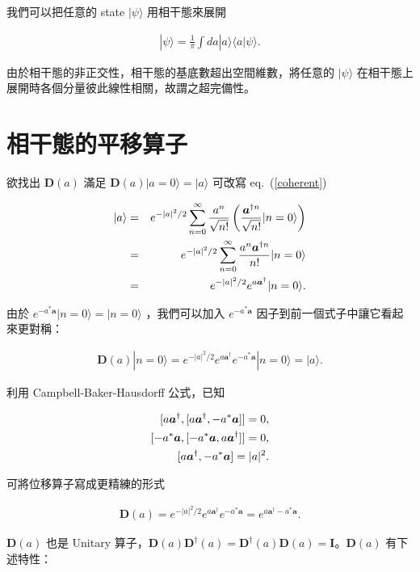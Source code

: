 \documentclass[pop,reprint]{revtex4-1}
\newcommand{\ket}[1]{|#1\rangle }
\newcommand{\braket}[2]{\langle#1|#2\rangle }
\begin{document}
我們可以把任意的 state $ \ket{\psi} $ 用相干態來展開

\begin{eqnarray}
\ket{\psi}=\frac{1}{\pi}\int da\ket{a}\braket{a}{\psi}.
\end{eqnarray}

由於相干態的非正交性，相干態的基底數超出空間維數，將任意的 $ \ket{\psi} $ 在相干態上展開時各個分量彼此線性相關，故謂之超完備性。

\section{相干態的平移算子}

欲找出 $ \bm{D}(a) $ 滿足 $  \bm{D}(a)\ket{a=0}=\ket{a} $ 可改寫 eq.~(\ref{coherent})

\begin{eqnarray}
\notag\ket{a}&=&e^{-|a|^2/2}\sum_{n=0}^\infty\frac{a^n}{\sqrt{n!}}\left(\frac{\bm{a}^{\dag n}}{\sqrt{n!}}\ket{n=0}\right)\\
\notag&=&e^{-|a|^2/2}\sum_{n=0}^\infty\frac{a^n\bm{a}^{\dag n}}{n!}\ket{n=0}\\
&=&e^{-|a|^2/2}e^{a\bm{a}^\dag}\ket{n=0}.
\end{eqnarray}

由於 $ e^{-a^*\bm{a}}\ket{n=0}=\ket{n=0} $ ，我們可以加入 $e^{-a^*\bm{a}}$ 因子到前一個式子中讓它看起來更對稱：

\begin{eqnarray}
\bm{D}(a)\ket{n=0}=e^{-|a|^2/2}e^{a\bm{a}^\dag}e^{-a^*\bm{a}}\ket{n=0}=\ket{a}.
\end{eqnarray}

利用 Campbell-Baker-Hausdorff 公式，已知

\begin{eqnarray}
\notag [a\bm{a}^\dag,[a\bm{a}^\dag,-a^*\bm{a}]]=0,\\
\notag [-a^*\bm{a},[-a^*\bm{a},a\bm{a}^\dag]]=0,\\
\protect[a\bm{a}^\dag, -a^*\bm{a}]=|a|^2.
\end{eqnarray}

可將位移算子寫成更精練的形式

\begin{eqnarray}
\bm{D}(a)=e^{-|a|^2/2}e^{a\bm{a}^\dag}e^{-a^*\bm{a}}=
e^{a\bm{a}^\dag-a^*\bm{a}}.
\end{eqnarray}

$ \bm{D}(a) $ 也是 Unitary 算子，$ \bm{D}(a)\bm{D}^\dag(a)=\bm{D}^\dag(a)\bm{D}(a)=\mathbf{I} $。$ \bm{D}(a) $ 有下述特性：
\end{document}
